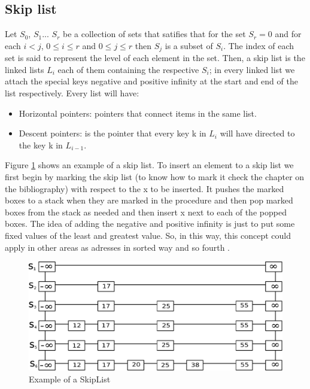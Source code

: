 \documentclass{sig-alternate-05-2015}
\begin{document}
    \subsection{Skip list}
      Let $S_{0}$, $S_{1}$... $S_r$ be a collection of sets that satifies that for the set $S_r = 0$ and for each $i<j$, $0\leq i \leq r$ and $0\leq j\leq r$ then
      $S_j$ is a subset of $S_i$. The index of each set is said to represent the level of each element in the set. Then, a skip list
      is the linked lists $L_i$ each of them containing the respective $S_i$; in every linked list we attach the special keys negative
      and positive infinity at the start and end of the list respectively. Every list will have:
      \begin{itemize}
        \item Horizontal pointers: pointers that connect items in the same list.
        \item Descent pointers: is the pointer that every key k in $L_i$ will have directed to the key k in $L_{i-1}$.
      \end{itemize}
      Figure \ref{img:skipList} shows an example of a skip list.
      To insert an element to a skip list we first begin by marking the skip list (to know how to mark it check the chapter on
      the bibliography) with respect to the x to be inserted. It pushes the marked boxes to a stack when they are
      marked in the procedure and then pop marked boxes from the stack as needed and then insert x next to each of the popped
      boxes.
      The idea of adding the negative and positive infinity is just to put some fixed values of the least and greatest
      value. So, in this way, this concept could apply in other areas as adresses in sorted way and so fourth \cite{Mehta:Handbook}.
      \begin{figure}[t]
        \centering
        \includegraphics[scale=0.4]{SkipList.pdf}
        \caption{Example of a SkipList}
        \label{img:skipList}
      \end{figure}
\end{document}
